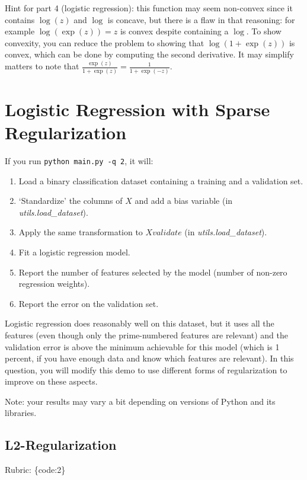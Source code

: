 \documentclass{article}
\def\rubric#1{\gre{Rubric: \{#1\}}}{}
\def\gre#1{{\color{gre}#1}}
\def\enum#1{\begin{enumerate}#1\end{enumerate}}
\begin{document}
Hint for part 4 (logistic regression): this function may seem non-convex since it contains $\log(z)$ and $\log$ is concave, but there is a flaw in that reasoning: for example $\log(\exp(z))=z$ is convex despite containing a $\log$. To show convexity, you can reduce the problem to showing that $\log(1+\exp(z))$ is convex, which can be done by computing the second derivative. It may simplify matters to note that $\frac{\exp(z)}{1+\exp(z)} = \frac{1}{1+\exp(-z)}$.


\section{Logistic Regression with Sparse Regularization}

If you run  \verb|python main.py -q 2|, it will:
\enum{
\item Load a binary classification dataset containing a training and a validation set.
\item `Standardize' the columns of $X$ and add a bias variable (in \emph{utils.load\_dataset}).
\item Apply the same transformation to $Xvalidate$ (in \emph{utils.load\_dataset}).
\item Fit a logistic regression model.
\item Report the number of features selected by the model (number of non-zero regression weights).
\item Report the error on the validation set.
}
Logistic regression does reasonably well on this dataset,
but it uses all the features (even though only the prime-numbered features are relevant)
and the validation error is above the minimum achievable for this model
(which is 1 percent, if you have enough data and know which features are relevant).
In this question, you will modify this demo to use different forms of regularization
 to improve on these aspects.

Note: your results may vary a bit depending on versions of Python and its libraries.


\subsection{L2-Regularization}
\rubric{code:2}
\end{document}
